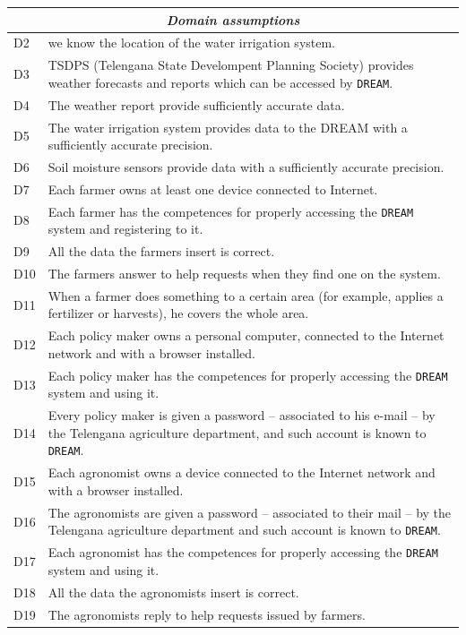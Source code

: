 \documentclass{article}
\begin{document}
\begin{longtable}[c]{|m{0.75cm}|m{11cm}|}
 \hline
 \multicolumn{2}{|c|}{\cellcolor{white}\textbf{\emph{Domain assumptions}}}
 \endfirsthead
 \endhead
 \endfoot
 \endlastfoot
  \hline
  D1 & we know the location of the sensors.\\
  \hline
   D2 & we know the location of the water irrigation system.\\
  \hline
  D3 & TSDPS (Telengana State Develompent Planning Society) provides weather forecasts and reports which can be accessed by \verb|DREAM|.\\
  \hline
  D4 & The weather report provide sufficiently accurate data.\\
  \hline
  D5 & The water irrigation system provides data to the DREAM with a sufficiently accurate precision.\\
  \hline
  D6 & Soil moisture sensors provide data with a sufficiently accurate precision.\\
  \hline
  D7 & Each farmer owns at least one device connected to Internet.\\
  \hline
  D8 & Each farmer has the competences for properly accessing the \verb|DREAM| system and registering to it.\\
  \hline
  D9 & All the data the farmers insert is correct.\\
  \hline
  D10 & The farmers answer to help requests when they find one on the system.\\
  \hline
  D11 & When a farmer does something to a certain area (for example, applies a fertilizer or harvests), he covers the whole area.\\
  \hline
  D12 & Each policy maker owns a personal computer, connected to the Internet network and with a browser installed.\\
 \hline
  D13 & Each policy maker has the competences for properly accessing the \verb|DREAM| system and using it.\\
  \hline
  D14 & Every policy maker is given a password – associated to his e-mail – by the Telengana agriculture department, and such account is known to \verb|DREAM|.\\
  \hline
  D15 & Each agronomist owns a device connected to the Internet network and with a browser installed.\\
  \hline
  D16 & The agronomists are given a password – associated to their mail – by the Telengana agriculture department and such account is known to \verb|DREAM|.\\
  \hline
  D17 & Each agronomist has the competences for properly accessing the \verb|DREAM| system and using it.\\
   \hline
  D18 & All the data the agronomists insert is correct.\\
  \hline
  D19 & The agronomists reply to help requests issued by farmers.\\
  \hline
  \end{longtable}
\end{document}
